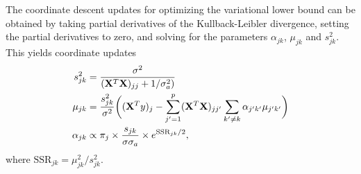 \documentclass[final]{siamltex}
\begin{document}
The coordinate descent updates for optimizing the variational lower
bound can be obtained by taking partial derivatives of the
Kullback-Leibler divergence, setting the partial derivatives to zero,
and solving for the parameters $\alpha_{jk}$, $\mu_{jk}$ and
$s_{jk}^2$. This yields coordinate updates
\begin{align*}
s_{jk}^2 &= \frac{\sigma^2}{({\bf X}^T{\bf X})_{jj} + 1/\sigma_a^2)} \\
\mu_{jk} &= \frac{s_{jk}^2}{\sigma^2}
\bigg(({\bf X}^Ty)_j 
- \sum_{j'=1}^p ({\bf X}^T{\bf X})_{jj'} 
  \sum_{k' \neq k} \alpha_{j'k'} \mu_{j'k'} \bigg) \\
\alpha_{jk} &\propto \pi_j \times \frac{s_{jk}}{\sigma\sigma_a}
\times e^{\mathrm{SSR}_{jk}/2},
\end{align*}
where $\mathrm{SSR}_{jk} = \mu_{jk}^2/s_{jk}^2$.
\end{document}
